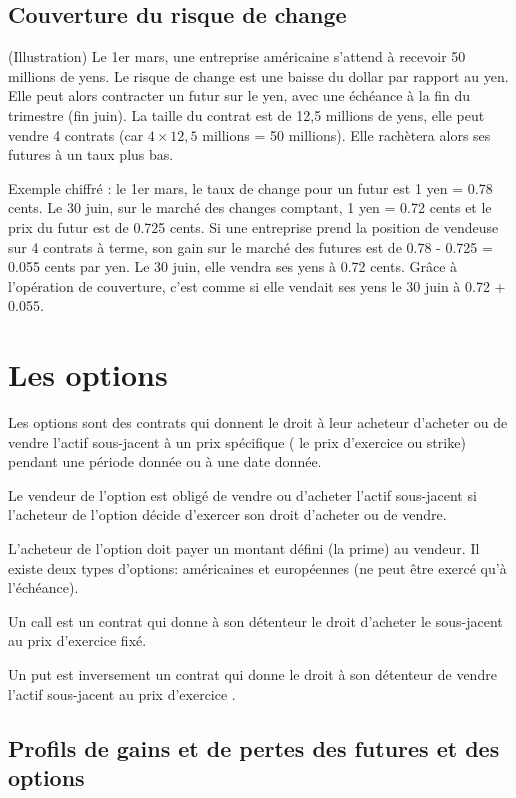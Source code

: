 	\subsection{Couverture du risque de change}
	
	(Illustration) Le 1er mars, une entreprise américaine s'attend à recevoir 50 millions de yens. Le risque de change est une baisse du dollar par rapport au yen. Elle peut alors contracter un futur sur le yen, avec une échéance à la fin du trimestre (fin juin). La taille du contrat est de 12,5 millions de yens, elle peut vendre 4 contrats (car $4 \times 12,5$ millions = 50 millions). Elle rachètera alors ses futures à un taux plus bas.

	Exemple chiffré : le 1er mars, le taux de change pour un futur est 1 yen = 0.78 cents. Le 30 juin, sur le marché des changes comptant, 1 yen = 0.72 cents et le prix du futur est de 0.725 cents. Si une entreprise prend la position de vendeuse sur 4 contrats à terme, son gain sur le marché des futures est de 0.78 - 0.725 = 0.055 cents par yen. Le 30 juin, elle vendra ses yens à 0.72 cents. Grâce à l'opération de couverture, c'est comme si elle vendait ses yens le 30 juin à 0.72 + 0.055.
	
	
\section{Les options}

Les options sont des contrats qui donnent le droit à leur acheteur d'acheter 
ou de vendre l'actif sous-jacent à un prix spécifique ( le prix d'exercice ou 
strike) pendant une période donnée ou à une date donnée. 

Le vendeur de l'option est obligé de vendre ou d'acheter l'actif sous-jacent 
si l'acheteur de l'option décide d'exercer son droit d'acheter ou de vendre.

L'acheteur de l'option doit payer un montant défini (la prime) au vendeur. Il existe deux types d'options: américaines et européennes (ne peut être exercé qu'à l'échéance).

Un call est un contrat qui donne à son détenteur le droit d'acheter le sous-jacent au prix d'exercice fixé. 

Un put est inversement un contrat qui donne le droit à son détenteur de 
vendre l'actif sous-jacent au prix d'exercice .

	\subsection{Profils de gains et de pertes des futures et des options}
	

